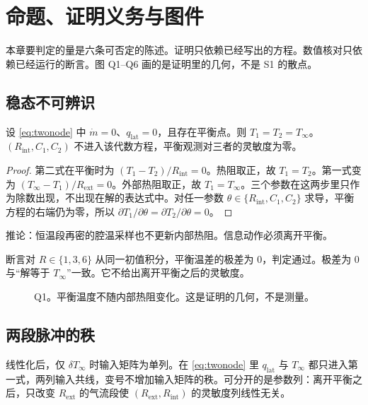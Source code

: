 \chapter{命题、证明义务与图件}
\label{ch:proof}

本章要判定的量是六条可否定的陈述。证明只依赖已经写出的方程。数值核对只依赖已经运行的断言。图 Q1--Q6 画的是证明里的几何，不是 S1 的散点。

\section{稳态不可辨识}

\begin{proposition}[平衡点不含内部参数]
\label{prop:steady}
设 \eqref{eq:twonode} 中 \(\dot m=0\)、\(q_{\mathrm{lat}}=0\)，且存在平衡点。则 \(T_1=T_2=T_\infty\)。\((R_{\mathrm{int}},C_1,C_2)\) 不进入该代数方程，平衡观测对三者的灵敏度为零。
\end{proposition}

\begin{proof}
第二式在平衡时为 \((T_1-T_2)/R_{\mathrm{int}}=0\)。热阻取正，故 \(T_1=T_2\)。第一式变为 \((T_\infty-T_1)/R_{\mathrm{ext}}=0\)。外部热阻取正，故 \(T_1=T_\infty\)。三个参数在这两步里只作为除数出现，不出现在解的表达式中。对任一参数 \(\theta\in\{R_{\mathrm{int}},C_1,C_2\}\) 求导，平衡方程的右端仍为零，所以 \(\partial T_1/\partial\theta=\partial T_2/\partial\theta=0\)。
\end{proof}

推论：恒温段再密的腔温采样也不更新内部热阻。信息动作必须离开平衡。

断言对 \(R\in\{1,3,6\}\) 从同一初值积分，平衡温差的极差为 0，判定通过。极差为 0 与“解等于 \(T_\infty\)”一致。它不给出离开平衡之后的灵敏度。

\begin{figure}[ht]
\centering
{}
\caption{Q1。平衡温度不随内部热阻变化。这是证明的几何，不是测量。}
\end{figure}

\section{两段脉冲的秩}

\begin{proposition}[第二输入方向]
\label{prop:pulse}
线性化后，仅 \(\delta T_\infty\) 时输入矩阵为单列。在 \eqref{eq:twonode} 里 \(q_{\mathrm{lat}}\) 与 \(T_\infty\) 都只进入第一式，两列输入共线，变号不增加输入矩阵的秩。可分开的是参数列：离开平衡之后，只改变 \(R_{\mathrm{ext}}\) 的气流段使 \((R_{\mathrm{ext}},R_{\mathrm{int}})\) 的灵敏度列线性无关。
\end{proposition}

